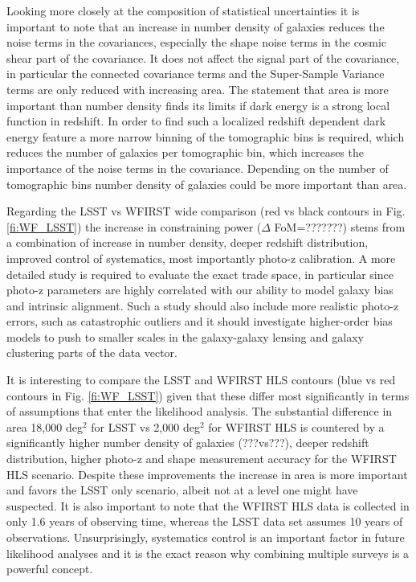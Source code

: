 \documentclass[fleqn,usenatbib,useAMS]{mnras}
\begin{document}
Looking more closely at the composition of statistical uncertainties it is important to note that an increase in number density of galaxies reduces the noise terms in the covariances, especially the shape noise terms in the cosmic shear part of the covariance. It does not affect the signal part of the covariance, in particular the connected covariance terms and the Super-Sample Variance terms are only reduced with increasing area. The statement that area is more important than number density finds its limits if dark energy is a strong local function in redshift. In order to find such a localized redshift dependent dark energy feature a more narrow binning of the tomographic bins is required, which reduces the number of galaxies per tomographic bin, which increases the importance of the noise terms in the covariance. Depending on the number of tomographic bins number density of galaxies could be more important than area.

Regarding the LSST vs WFIRST wide comparison (red vs black contours in Fig. \ref{fi:WF_LSST}) the increase in constraining power ($\Delta$ FoM=???????) stems from a combination of increase in number density, deeper redshift distribution, improved control of systematics, most importantly photo-z calibration. A more detailed study is required to evaluate the exact trade space, in particular since photo-z parameters are highly correlated with our ability to model galaxy bias and intrinsic alignment. Such a study should also include more realistic photo-z errors, such as catastrophic outliers and it should investigate higher-order bias models to push to smaller scales in the galaxy-galaxy lensing and galaxy clustering parts of the data vector. 

It is interesting to compare the LSST and WFIRST HLS contours (blue vs red contours in Fig. \ref{fi:WF_LSST}) given that these differ most significantly in terms of assumptions that enter the likelihood analysis. The substantial difference in area 18,000 deg$^2$ for LSST vs 2,000 deg$^2$ for WFIRST HLS is countered by a significantly higher number density of galaxies (???vs???), deeper redshift distribution, higher photo-z and shape measurement accuracy for the WFIRST HLS scenario. Despite these improvements the increase in area is more important and favors the LSST only scenario, albeit not at a level one might have suspected. It is also important to note that the WFIRST HLS data is collected in only 1.6 years of observing time, whereas the LSST data set assumes 10 years of observations. Unsurprisingly, systematics control is an important factor in future likelihood analyses and it is the exact reason why combining multiple surveys is a powerful concept.  
\end{document}
